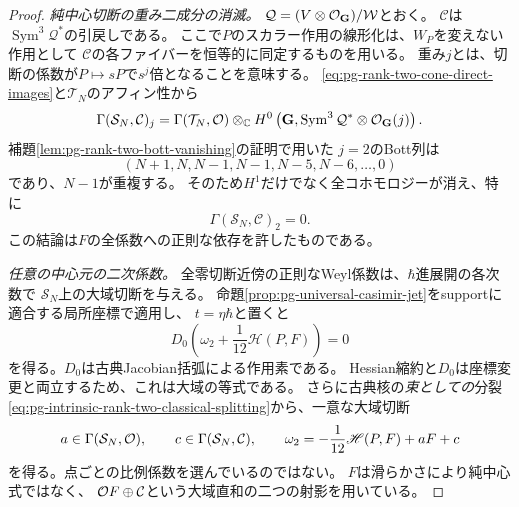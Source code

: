 \begin{proof}
\emph{純中心切断の重み二成分の消滅。}
$\mathcal Q=(V\otimes\mathcal O_{\mathbf G})/\mathcal W$とおく。
$\mathcal C$は$\operatorname{Sym}^3\mathcal Q^*$の引戻しである。
ここで$P$のスカラー作用の線形化は、$W_P$を変えない作用として
$\mathcal C$の各ファイバーを恒等的に同定するものを用いる。
重み$j$とは、切断の係数が$P\mapsto sP$で$s^j$倍となることを意味する。
\eqref{eq:pg-rank-two-cone-direct-images}と$\mathcal T_N$のアフィン性から
\begin{equation}
 \Gamma(\mathcal S_N,\mathcal C)_j
 =\Gamma(\mathcal T_N,\mathcal O)\otimes_\mathbb C
 H^0\left(\mathbf G,
     \operatorname{Sym}^3\mathcal Q^*\otimes\mathcal O_{\mathbf G}(j)\right).
 \label{eq:pg-intrinsic-pure-center-weight-sections}
\end{equation}
補題\ref{lem:pg-rank-two-bott-vanishing}の証明で用いた
$j=2$のBott列は
\begin{equation}
 (N+1,N,N-1,N-1,N-5,N-6,\ldots,0)
 \label{eq:pg-intrinsic-pure-center-weight-two-bott}
\end{equation}
であり、$N-1$が重複する。
そのため$H^1$だけでなく全コホモロジーが消え、特に
\begin{equation}
 \Gamma(\mathcal S_N,\mathcal C)_2=0.
 \label{eq:pg-intrinsic-pure-center-weight-two-zero}
\end{equation}
この結論は$F$の全係数への正則な依存を許したものである。

\emph{任意の中心元の二次係数。}
全零切断近傍の正則なWeyl係数は、$\hbar$進展開の各次数で
$\mathcal S_N$上の大域切断を与える。
命題\ref{prop:pg-universal-casimir-jet}をsupportに適合する局所座標で適用し、
$t=\eta\hbar$と置くと
\begin{equation}
 D_0\left(\omega_2+\frac1{12}\mathscr H(P,F)\right)=0
 \label{eq:pg-intrinsic-any-center-second-coefficient}
\end{equation}
を得る。$D_0$は古典Jacobian括弧による作用素である。
Hessian縮約と$D_0$は座標変更と両立するため、これは大域の等式である。
さらに古典核の\emph{束としての}分裂
\eqref{eq:pg-intrinsic-rank-two-classical-splitting}から、一意な大域切断
\begin{equation}
 a\in\Gamma(\mathcal S_N,\mathcal O),\qquad
 c\in\Gamma(\mathcal S_N,\mathcal C),\qquad
 \omega_2=-\frac1{12}\mathscr H(P,F)+aF+c
 \label{eq:pg-intrinsic-any-center-second-decomposition}
\end{equation}
を得る。点ごとの比例係数を選んでいるのではない。
$F$は滑らかさにより純中心式ではなく、
$\mathcal O F\oplus\mathcal C$という大域直和の二つの射影を用いている。


\end{proof}
